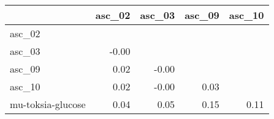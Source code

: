 \begin{tabular}{lrrrr}
\toprule
 & asc_02 & asc_03 & asc_09 & asc_10 \\
\midrule
asc_02 &  &  &  &  \\
asc_03 & -0.00 &  &  &  \\
asc_09 & 0.02 & -0.00 &  &  \\
asc_10 & 0.02 & -0.00 & 0.03 &  \\
mu-toksia-glucose & 0.04 & 0.05 & 0.15 & 0.11 \\
\bottomrule
\end{tabular}
